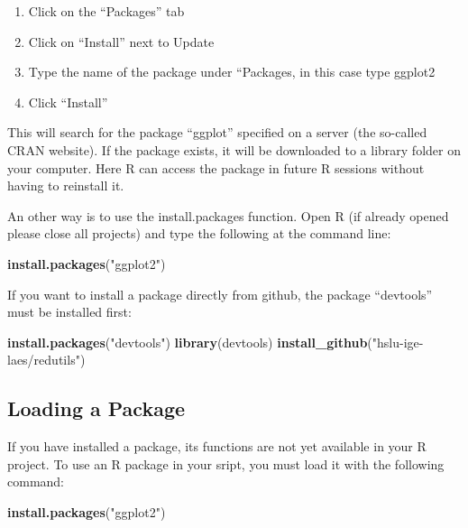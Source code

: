\documentclass[
]{book}
\newenvironment{Shaded}{\begin{snugshade}}{\end{snugshade}}
\newcommand{\KeywordTok}[1]{\textcolor[rgb]{0.13,0.29,0.53}{\textbf{#1}}}
\newcommand{\NormalTok}[1]{#1}
\newcommand{\StringTok}[1]{\textcolor[rgb]{0.31,0.60,0.02}{#1}}
\begin{document}
\begin{enumerate}
\def\labelenumi{\alph{enumi})}
\item
  Click on the ``Packages'' tab
\item
  Click on ``Install'' next to Update
\item
  Type the name of the package under ``Packages, in this case type ggplot2
\item
  Click ``Install''
\end{enumerate}

This will search for the package ``ggplot'' specified on a server (the so-called CRAN website). If the package exists, it will be downloaded to a library folder on your computer. Here R can access the package in future R sessions without having to reinstall it.

An other way is to use the install.packages function.
Open R (if already opened please close all projects) and type the following at the command line:

\begin{Shaded}
\begin{Highlighting}[]
\KeywordTok{install.packages}\NormalTok{(}\StringTok{"ggplot2"}\NormalTok{)}
\end{Highlighting}
\end{Shaded}

If you want to install a package directly from github, the package ``devtools'' must be installed first:

\begin{Shaded}
\begin{Highlighting}[]
\KeywordTok{install.packages}\NormalTok{(}\StringTok{"devtools"}\NormalTok{)}
\KeywordTok{library}\NormalTok{(devtools)}
\KeywordTok{install_github}\NormalTok{(}\StringTok{"hslu-ige-laes/redutils"}\NormalTok{)}
\end{Highlighting}
\end{Shaded}

\hypertarget{loading-a-package}{%
\subsection{Loading a Package}\label{loading-a-package}}

If you have installed a package, its functions are not yet available in your R project. To use an R package in your sript, you must load it with the following command:

\begin{Shaded}
\begin{Highlighting}[]
\KeywordTok{install.packages}\NormalTok{(}\StringTok{"ggplot2"}\NormalTok{)}
\end{Highlighting}
\end{Shaded}
\end{document}
